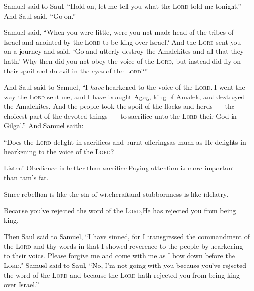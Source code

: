 \begin{inparaenum}
   Samuel said to Saul, ``Hold on, let me tell you what the \textsc{Lord} told me tonight.'' And Saul said, ``Go on.''%
  
   Samuel said, ``When you were little, were you not made head of the tribes of Israel and anointed by the \textsc{Lord} to be king over Israel?%
   And the \textsc{Lord} sent you on a journey and said, `Go and utterly destroy the Amalekites and all that they hath.'%
   Why then did you not obey the voice of the \textsc{Lord}, but instead did fly on their spoil and do evil in the eyes of the \textsc{Lord}?''%
  
   And Saul said to Samuel, ``I \emph{have} hearkened to the voice of the \textsc{Lord}. I went the way the \textsc{Lord} sent me, and I have brought Agag, king of Amalek, and destroyed the Amalekites.%
   And the people took the spoil of the flocks and herds~--- the choicest part of the devoted things~--- to sacrifice unto the \textsc{Lord} their God in Gilgal.''%
   And Samuel saith:%
  
  \pb ``Does the \textsc{Lord} delight in sacrifices and burnt offerings\pa as much as He delights in hearkening to the voice of the \textsc{Lord}?%
  
  \pb Listen! Obedience is better than sacrifice.\pa Paying attention is more important than ram's fat.%
  
  \pa {} Since rebellion is like the sin of witchcraft\pa and stubbornness is like idolatry.%
  
  \pb Because you've rejected the word of the \textsc{Lord},\pa He has rejected you from being king.%
  
   Then Saul said to Samuel, ``I have sinned, for I transgressed the commandment of the \textsc{Lord} and thy words in that I showed reverence to the people by hearkening to their voice.%
   Please forgive me and come with me as I bow down before the \textsc{Lord}.''%
   Samuel said to Saul, ``No, I'm not going with you because you've rejected the word of the \textsc{Lord} and because the \textsc{Lord} hath rejected you from being king over Israel.''%
  

\end{inparaenum}
